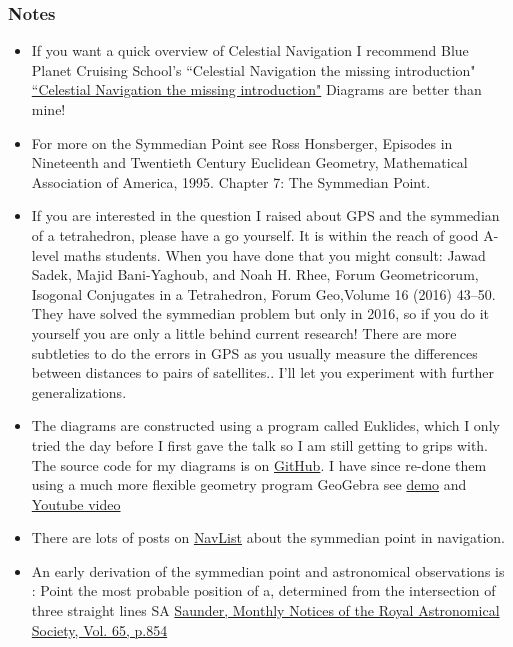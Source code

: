 \documentclass{beamer}
\begin{document}
\begin{frame}\frametitle{Notes}
\tiny
\begin{itemize}
\item If you want a quick overview of Celestial Navigation I recommend Blue Planet Cruising School's ``Celestial Navigation the missing introduction" \href{http://www.blueplanetcruisingschool.com/celestial-navigation-the-missing-introduction/}{``Celestial Navigation the missing introduction"} Diagrams are better than mine!
\item For more on the Symmedian Point see Ross Honsberger, Episodes in Nineteenth and Twentieth Century Euclidean Geometry, Mathematical Association of America, 1995. Chapter 7: The Symmedian Point. 
\item If you are interested in the question I raised about GPS and the symmedian of a tetrahedron, please have a go yourself. It is within the reach of good A-level maths students. When you have done that you might consult: Jawad Sadek, Majid Bani-Yaghoub, and Noah H. Rhee, Forum Geometricorum, Isogonal Conjugates in a Tetrahedron,
Forum Geo,Volume 16 (2016) 43–50. They have solved the symmedian problem but only in 2016, so if you do it yourself you are only a little behind current research! There are more subtleties to do the errors in GPS as you usually measure the differences between distances to pairs of satellites.. I'll let you experiment with further generalizations.
\item The diagrams are constructed using a program called Euklides, which I only tried the day before I first gave the talk so I am still getting to grips with. The source code for my diagrams is on \href{https://github.com/billlion/symmedian-talk}{GitHub}. I have since re-done them using a much more flexible geometry program GeoGebra see \href{https://www.geogebra.org/material/show/id/xzMrFwzf}{demo} and \href{https://www.youtube.com/watch?v=IXjagimXuv8}{Youtube video} 
\item There are lots of posts on \href{http://fer3.com/arc/m2.aspx/Finding-Symmedian-PeterFogg-dec-2010-g15003}{NavList} about the symmedian point in navigation.
\item An early derivation of the symmedian point and astronomical observations is : Point the most probable position of a, determined from the intersection of three straight lines SA \href{http://adsabs.harvard.edu/full/1905MNRAS..65..854S}{Saunder,  Monthly Notices of the Royal Astronomical Society, Vol. 65, p.854}

\end{itemize}
\end{frame}
\end{document}
